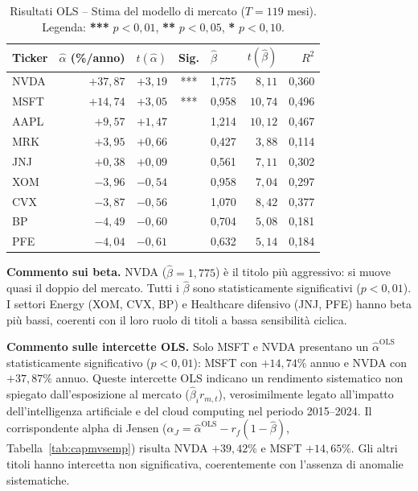 \documentclass[11pt]{article}
\begin{document}
\begin{table}[h!]
\centering
\caption{Risultati OLS -- Stima del modello di mercato ($T = 119$ mesi).
Legenda: \textbf{***} $p{<}0{,}01$, \textbf{**} $p{<}0{,}05$,
\textbf{*} $p{<}0{,}10$.}
\label{tab:ols}
\begin{tabular}{lrrclrr}
\toprule
\textbf{Ticker} &
\textbf{$\hat\alpha$ (\%/anno)} &
\textbf{$t(\hat\alpha)$} &
\textbf{Sig.} &
\textbf{$\hat\beta$} &
\textbf{$t(\hat\beta)$} &
\textbf{$R^2$} \\
\midrule
NVDA  & $+37{,}87$ & $+3{,}19$ & *** & 1{,}775 & $8{,}11$ & 0{,}360 \\
MSFT  & $+14{,}74$ & $+3{,}05$ & *** & 0{,}958 & $10{,}74$ & 0{,}496 \\
AAPL  &  $+9{,}57$ & $+1{,}47$ &     & 1{,}214 & $10{,}12$ & 0{,}467 \\
MRK   &  $+3{,}95$ & $+0{,}66$ &     & 0{,}427 &  $3{,}88$ & 0{,}114 \\
JNJ   &  $+0{,}38$ & $+0{,}09$ &     & 0{,}561 &  $7{,}11$ & 0{,}302 \\
XOM   &  $-3{,}96$ & $-0{,}54$ &     & 0{,}958 &  $7{,}04$ & 0{,}297 \\
CVX   &  $-3{,}87$ & $-0{,}56$ &     & 1{,}070 &  $8{,}42$ & 0{,}377 \\
BP    &  $-4{,}49$ & $-0{,}60$ &     & 0{,}704 &  $5{,}08$ & 0{,}181 \\
PFE   &  $-4{,}04$ & $-0{,}61$ &     & 0{,}632 &  $5{,}14$ & 0{,}184 \\
\bottomrule
\end{tabular}
\end{table}

\textbf{Commento sui beta.}
NVDA ($\hat\beta = 1{,}775$) è il titolo più aggressivo: si muove
quasi il doppio del mercato. Tutti i $\hat\beta$ sono
statisticamente significativi ($p < 0{,}01$).
I settori Energy (XOM, CVX, BP) e Healthcare difensivo (JNJ, PFE)
hanno beta più bassi, coerenti con il loro ruolo di titoli
a bassa sensibilità ciclica.

\textbf{Commento sulle intercette OLS.}
Solo MSFT e NVDA presentano un $\hat\alpha^{\text{OLS}}$ statisticamente
significativo ($p{<}0{,}01$): MSFT con $+14{,}74\%$ annuo e
NVDA con $+37{,}87\%$ annuo. Queste intercette OLS indicano
un rendimento sistematico non spiegato dall'esposizione al mercato
($\hat\beta_i r_{m,t}$), verosimilmente legato all'impatto
dell'intelligenza artificiale e del cloud computing nel periodo 2015--2024.
Il corrispondente alpha di Jensen
($\alpha_J = \hat\alpha^{\text{OLS}} - r_f(1-\hat\beta)$, Tabella~\ref{tab:capmvsemp})
risulta NVDA $+39{,}42\%$ e MSFT $+14{,}65\%$.
Gli altri titoli hanno intercetta non significativa,
coerentemente con l'assenza di anomalie sistematiche.
\end{document}
